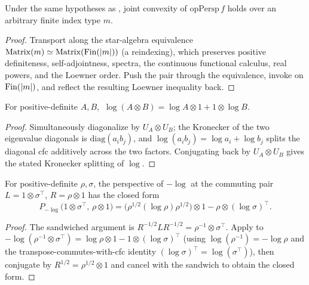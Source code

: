 \begin{theorem}\label{opPersp_jointly_convex}
  \leanok
  Under the same hypotheses as , joint convexity of
  \(\mathrm{opPersp}\,f\) holds over an arbitrary finite index type \(m\).
\end{theorem}
\begin{proof}\leanok
  Transport along the star-algebra equivalence
  \(\operatorname{Matrix}(m)\simeq\operatorname{Matrix}(\operatorname{Fin}(\left\lvert m \right\rvert))\) (a reindexing), which preserves positive definiteness,
  self-adjointness, spectra, the continuous functional calculus, real powers, and the Loewner
  order. Push the pair through the equivalence, invoke
   on \(\operatorname{Fin}(\left\lvert m \right\rvert)\), and reflect the resulting Loewner
  inequality back.
\end{proof}

\begin{lemma}\label{cfc_log_kron}
  \leanok
  For positive-definite \(A,B\), \(\ \log(A\otimes B) = \log A\otimes 1 + 1\otimes\log B\).
\end{lemma}
\begin{proof}\leanok
  Simultaneously diagonalize by \(U_A\otimes U_B\); the Kronecker of the two eigenvalue diagonals
  is \(\mathrm{diag}(a_i b_j)\), and \(\log(a_i b_j) = \log a_i + \log b_j\) splits the diagonal
  cfc additively across the two factors. Conjugating back by \(U_A\otimes U_B\) gives the stated
  Kronecker splitting of \(\log\).
\end{proof}

\begin{lemma}\label{opPersp_neg_log_kron}
  \leanok
  For positive-definite \(\rho,\sigma\), the perspective of \(-\log\) at the commuting pair
  \(L = 1\otimes\sigma^{\top}\), \(R = \rho\otimes 1\) has the closed form
  \[
    P_{-\log}\bigl(1\otimes\sigma^{\top},\,\rho\otimes 1\bigr)
      = \bigl(\rho^{1/2}(\log\rho)\rho^{1/2}\bigr)\otimes 1 - \rho\otimes(\log\sigma)^{\top}.
  \]
\end{lemma}
\begin{proof}\leanok
  The sandwiched argument is \(R^{-1/2}LR^{-1/2} = \rho^{-1}\otimes\sigma^{\top}\). Apply
   to
  \(-\log(\rho^{-1}\otimes\sigma^{\top}) = \log\rho\otimes 1 - 1\otimes(\log\sigma)^{\top}\)
  (using \(\log(\rho^{-1}) = -\log\rho\) and the transpose-commutes-with-cfc identity
  \((\log\sigma)^{\top} = \log(\sigma^{\top})\)), then conjugate by
  \(R^{1/2} = \rho^{1/2}\otimes 1\) and cancel with the sandwich to obtain the closed form.
\end{proof}

